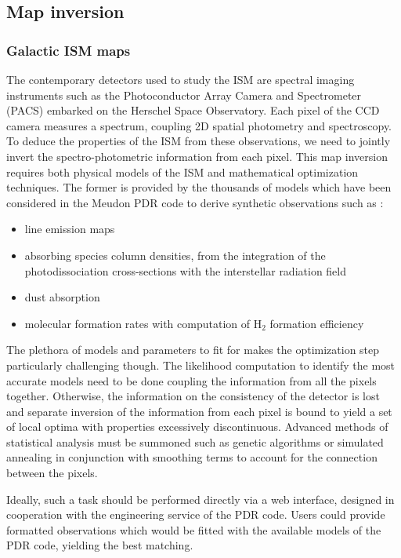 \documentclass[a4paper,12pt,onecolumn]{article}
\makeatletter
\newcommand*{\hhm}{H$_{2}$\@\xspace}
\makeatother
\begin{document}
\subsection*{Map inversion}

\subsubsection*{Galactic ISM maps}

The contemporary detectors used to study the ISM are spectral imaging instruments such as the Photoconductor Array Camera and Spectrometer (PACS) embarked on the Herschel Space Observatory. Each pixel of the CCD camera measures a spectrum, coupling 2D spatial photometry and spectroscopy. To deduce the properties of the ISM from these observations, we need to jointly invert the spectro-photometric information from each pixel. This map inversion requires both physical models of the ISM and mathematical optimization techniques. The former is provided by the thousands of models which have been considered in the Meudon PDR code to derive synthetic observations such as :
\begin{itemize}
\item line emission maps
\item absorbing species column densities, from the integration of the photodissociation cross-sections with the interstellar radiation field
\item dust absorption 
\item molecular formation rates with computation of \hhm formation efficiency
\end{itemize}

The plethora of models and parameters to fit for makes the optimization step particularly challenging though. The likelihood computation to identify the most accurate models need to be done coupling the information from all the pixels together. Otherwise, the information on the consistency of the detector is lost and separate inversion of the information from each pixel is bound to yield a set of local optima with properties excessively discontinuous. Advanced methods of statistical analysis must be summoned such as genetic algorithms or simulated annealing in conjunction with smoothing terms to account for the connection between the pixels. 

Ideally, such a task should be performed directly via a web interface, designed in cooperation with the engineering service of the PDR code. Users could provide formatted observations which would be fitted with the available models of the PDR code, yielding the best matching.
\end{document}
